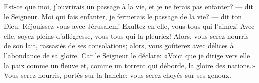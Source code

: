 Est-ce que moi, j’ouvrirais un passage à la vie,
	et je ne ferais pas enfanter? --- dit le Seigneur.
Moi qui fais enfanter, je fermerais le passage de la vie? --- dit ton Dieu.
Réjouissez-vous avec Jérusalem!
	Exultez en elle, vous tous qui l’aimez!
	Avec elle, soyez pleins d’allégresse, vous tous qui la pleuriez!
Alors, vous serez nourris de son lait, rassasiés de ses consolations;
	alors, vous goûterez avec délices à l’abondance de sa gloire.
Car le Seigneur le déclare:
	«Voici que je dirige vers elle la paix comme un fleuve
	et, comme un torrent qui déborde, la gloire des nations.»
Vous serez nourris, portés sur la hanche;
	vous serez choyés sur ses genoux.
